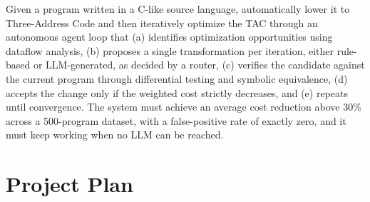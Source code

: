 \documentclass[12pt,a4paper]{report}
\begin{document}
Given a program written in a C-like source language, automatically lower it to Three-Address Code and then iteratively optimize the TAC through an autonomous agent loop that (a) identifies optimization opportunities using dataflow analysis, (b) proposes a single transformation per iteration, either rule-based or LLM-generated, as decided by a router, (c) verifies the candidate against the current program through differential testing and symbolic equivalence, (d) accepts the change only if the weighted cost strictly decreases, and (e) repeats until convergence. The system must achieve an average cost reduction above 30\% across a 500-program dataset, with a false-positive rate of exactly zero, and it must keep working when no LLM can be reached.

\section{Project Plan}
\end{document}
